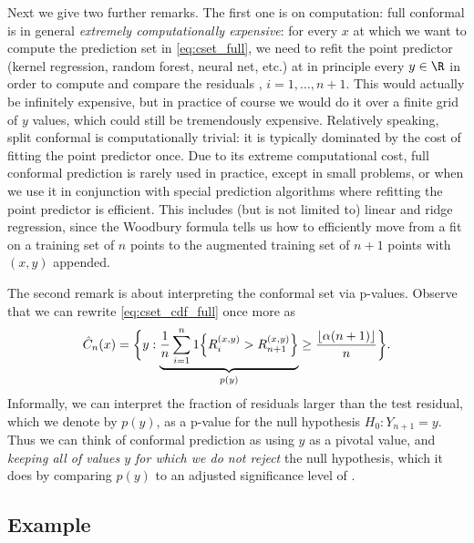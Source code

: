 \documentclass{article}
\begin{document}
Next we give two further remarks. The first one is on computation: full
conformal is in general \emph{extremely computationally expensive}: for every
$x$ at which we want to compute the prediction set  in
\eqref{eq:cset_full}, we need to refit the point predictor 
 (kernel regression, random forest, neural net, etc.) at 
in principle every $y \in \R$ in order to compute and compare the residuals
, $i=1,\dots,n+1$. This would actually be infinitely
expensive, but in practice of course we would do it over a finite grid of $y$
values, which could still be tremendously expensive. Relatively speaking, split 
conformal is computationally trivial: it is typically dominated by the cost of
fitting the point predictor  once. Due to its extreme
computational cost, full conformal prediction is rarely used in practice, except
in small problems, or when we use it in conjunction with special prediction
algorithms where refitting the point predictor is efficient. This includes (but
is not limited to) linear and ridge regression, since the Woodbury formula tells
us how to efficiently move from a fit on a training set of $n$ points to the
augmented training set of $n+1$ points with $(x,y)$ appended.   

The second remark is about interpreting the conformal set via p-values. Observe 
that we can rewrite \eqref{eq:cset_cdf_full} once more as
\[
\hat{C}_n(x) = \bigg\{ y : \underbrace{\frac{1}{n} \sum_{i=1}^n 1\Big\{ R_i^{(x,y)} 
  > R^{(x,y)}_{n+1} \Big\}}_{p(y)} \geq \frac{\lfloor \alpha (n+1) \rfloor}{n} 
\bigg\}.  
\]
Informally, we can interpret the fraction of residuals larger than the test
residual, which we denote by $p(y)$, as a p-value for the null hypothesis $H_0: 
Y_{n+1} = y$. Thus we can think of conformal prediction as using $y$ as a
pivotal value, and \emph{keeping all of values $y$ for which we do not reject}
the null hypothesis, which it does by comparing $p(y)$ to an adjusted
significance level of .

\subsection{Example}
\end{document}
